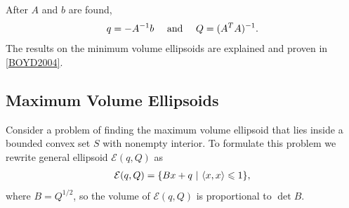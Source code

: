 \documentclass[letterpaper,10pt,english]{sphinxmanual}
\begin{document}
After \(A\) and \(b\) are found,
\begin{gather}
\begin{split}q=-A^{-1}b ~~~ \mbox{ and } ~~~ Q=(A^TA)^{-1}.\end{split}\notag
\end{gather}
The results on the minimum volume ellipsoids are explained and proven in
{\hyperref[chap_ellcalc:boyd2004]{{[}BOYD2004{]}}}.


\subsection{Maximum Volume Ellipsoids}
\label{chap_ellcalc:maximum-volume-ellipsoids}
Consider a problem of finding the maximum volume ellipsoid that lies
inside a bounded convex set \(S\) with nonempty interior. To
formulate this problem we rewrite general ellipsoid
\({\mathcal E}(q,Q)\) as
\begin{gather}
\begin{split}{\mathcal E}(q,Q) = \{Bx + q ~|~ \langle x,x\rangle\leqslant1\},\end{split}\notag
\end{gather}
where \(B=Q^{1/2}\), so the volume of \({\mathcal E}(q,Q)\) is
proportional to \(\det B\).
\end{document}
